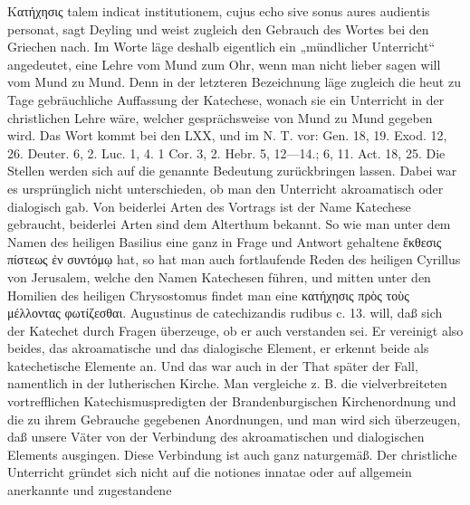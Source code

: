 Κατήχησις talem indicat institutionem, cujus echo sive sonus aures audientis personat, sagt Deyling und weist zugleich den Gebrauch des Wortes bei den Griechen nach. Im Worte läge deshalb eigentlich ein „mündlicher Unterricht“ angedeutet, eine Lehre vom Mund zum Ohr, wenn man nicht lieber sagen will vom Mund zu Mund. Denn in der letzteren Bezeichnung läge zugleich die heut zu Tage gebräuchliche Auffassung der Katechese, wonach sie ein Unterricht in der christlichen Lehre wäre, welcher gesprächsweise von Mund zu Mund gegeben wird. Das Wort kommt bei den LXX,
und im N. T. vor: Gen. 18, 19. Exod. 12, 26. Deuter. 6, 2. Luc. 1, 4. 1 Cor. 3, 2. Hebr. 5, 12—14.; 6, 11. Act. 18, 25. Die Stellen werden sich auf die genannte Bedeutung zurückbringen lassen. Dabei war es ursprünglich nicht unterschieden, ob man den Unterricht akroamatisch oder dialogisch gab. Von beiderlei Arten des Vortrags ist der Name Katechese gebraucht, beiderlei Arten sind dem Alterthum bekannt. So wie man unter dem Namen des heiligen Basilius eine ganz in Frage und Antwort gehaltene ἔκθεσις πίστεως ἐν συντόμῳ hat, so hat man auch fortlaufende Reden des heiligen Cyrillus von Jerusalem, welche den Namen Katechesen führen, und mitten unter den Homilien des heiligen Chrysostomus findet man eine κατήχησις πρὸς τοὺς μέλλοντας φωτίζεσθαι. Augustinus de catechizandis rudibus c. 13. will, daß sich der Katechet durch Fragen überzeuge, ob er auch verstanden sei. Er vereinigt also beides, das akroamatische und das dialogische Element, er erkennt beide als katechetische Elemente an. Und das war auch in der That später der Fall, namentlich in der lutherischen Kirche. Man vergleiche z. B. die vielverbreiteten vortrefflichen Katechismuspredigten der Brandenburgischen Kirchenordnung und die zu ihrem Gebrauche gegebenen Anordnungen, und man wird sich überzeugen, daß unsere Väter von der Verbindung des akroamatischen und dialogischen Elements ausgingen. Diese Verbindung ist auch ganz naturgemäß. Der christliche Unterricht gründet sich nicht auf die notiones innatae oder auf allgemein anerkannte und zugestandene
